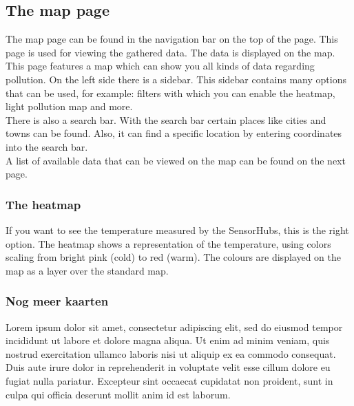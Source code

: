 \documentclass[a4paper]{article}
\begin{document}
\subsection{The map page}
The map page can be found in the navigation bar on the top of the page. This page is used for viewing the gathered data. The data is displayed on the map.
\\
This page features a map which can show you all kinds of data regarding pollution. On the left side there is a sidebar. This sidebar contains many options that can be used, for example: filters with which you can enable the heatmap, light pollution map and more.
\\
There is also a search bar. With the search bar certain places like cities and towns can be found. Also, it can find a specific location by entering coordinates into the search bar.
\\
A list of available data that can be viewed on the map can be found on the next page.

\pagebreak

\subsubsection{The heatmap}
If you want to see the temperature measured by the SensorHubs, this is the right option.
The heatmap shows a representation of the temperature, using colors scaling from bright pink (cold) to red (warm). The colours are displayed on the map as a layer over the standard map.
~\\

\subsubsection{Nog meer kaarten}
Lorem ipsum dolor sit amet, consectetur adipiscing elit, sed do eiusmod tempor incididunt ut labore et dolore magna aliqua. Ut enim ad minim veniam, quis nostrud exercitation ullamco laboris nisi ut aliquip ex ea commodo consequat. Duis aute irure dolor in reprehenderit in voluptate velit esse cillum dolore eu fugiat nulla pariatur. Excepteur sint occaecat cupidatat non proident, sunt in culpa qui officia deserunt mollit anim id est laborum.

\pagebreak
\end{document}
